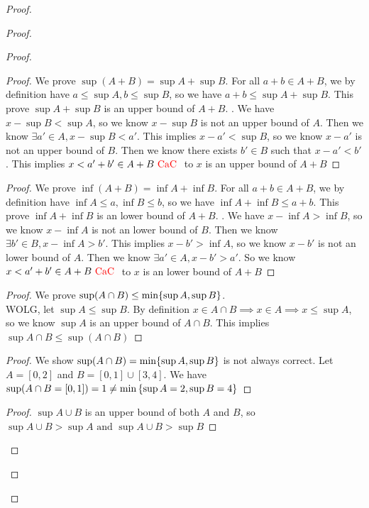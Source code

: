 \documentclass{report}
\begin{document}
\begin{proof}
\begin{proof}
\begin{proof}
\begin{question}{}{}
\begin{enumerate}
\end{enumerate}
\end{question}
\begin{proof}
We prove $\sup (A+B)=\sup A+\sup B$. For all $a+b \in A+B$, we by definition have $a\leq \sup A, b\leq \sup B$, so we have $a+b\leq \sup A+\sup B$. This prove $\sup A+\sup B$ is an upper bound of $A+B$. . We have $x-\sup B<\sup A$, so we know $x-\sup B$ is not an upper bound of $A$. Then we know  $\exists a'\in A, x-\sup B<a'$. This implies $x-a'< \sup B$, so we know $x-a'$ is not an upper bound of  $B$. Then we know there exists  $b' \in B$ such that $x-a'< b'$. This implies $x<a'+b' \in A+B\text{ \textcolor{red}{CaC} }$ to $x$ is an upper bound of  $A+B$
\end{proof}
\begin{proof}
We prove $\inf (A+B)= \inf A +\inf B$. For all $a+b \in A+B$, we by definition have $\inf A\leq a,\inf B\leq b$, so we have $\inf A+\inf B\leq a+b$. This prove $\inf A+ \inf B$ is an lower bound of $A+B$.  . We have $x- \inf A > \inf B$, so we know $x - \inf A$ is not an lower bound of $B$. Then we know  $\exists b' \in B, x- \inf A > b'$. This implies $x-b'>\inf A$, so we know $x- b'$ is not an lower bound of $A$. Then we know  $\exists a' \in A, x-b'>a'$. So we know $x<a'+b' \in A+B\text{ \textcolor{red}{CaC} }$ to $x$ is an lower bound of $A+B$ 
\end{proof}
\begin{proof}
We prove $\sup (A\cap B)\leq \min \{ \sup A,\sup  B \}$.\\

WOLG, let $\sup A\leq \sup B$. By definition $x \in A\cap B \implies  x \in A \implies x\leq \sup A$, so we know $\sup A$ is an upper bound of $A\cap B$. This implies $\sup A\cap B\leq \sup (A\cap B)$ 
\end{proof}
\begin{proof}
We show $\sup (A\cap B)= \min \{ \sup A,\sup B \}$ is not always correct. Let $A=[0,2]$ and $B=[0,1]\cup [3,4]$. We have $\sup (A\cap B= [0,1])=1\neq \min{\{ \sup A=2,\sup B=4 \}}$
\end{proof}
\begin{proof}
$\sup A\cup B$ is an upper bound of both $A$ and  $B$, so  $\sup A\cup B>\sup A\text{ and }\sup A\cup B>\sup B$


\end{proof}
\end{proof}
\end{proof}
\end{proof}
\end{document}
